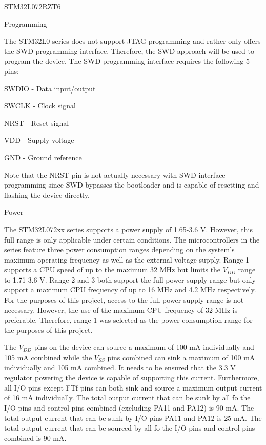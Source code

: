 STM32L072RZT6

Programming

The STM32L0 series does not support JTAG programming and rather only offers the SWD programming interface. Therefore, the SWD approach will be used to program the device. The SWD programming interface requires the following 5 pins:

\begin{compactitem}
	\item SWDIO - Data input/output
	\item SWCLK - Clock signal
	\item NRST - Reset signal
	\item VDD - Supply voltage
	\item GND - Ground reference
\end{compactitem}

Note that the NRST pin is not actually necessary with SWD interface programming since SWD bypasses the bootloader and is capable of resetting and flashing the device directly.

Power

The STM32L072xx series supports a power supply of 1.65-3.6 V. However, this full range is only applicable under certain conditions. The microcontrollers in the series feature three power consumption ranges depending on the system's maximum operating frequency as well as the external voltage supply. Range 1 supports a CPU speed of up to the maximum 32 MHz but limits the $V_{DD}$ range to 1.71-3.6 V. Range 2 and 3 both support the full power supply range but only support a maximum CPU frequency of up to 16 MHz and 4.2 MHz respectively. For the purposes of this project, access to the full power supply range is not necessary. However, the use of the maximum CPU frequency of 32 MHz is preferable. Therefore, range 1 was selected as the power consumption range for the purposes of this project.

The $V_{DD}$ pins on the device can source a maximum of 100 mA individually and 105 mA combined while the $V_{SS}$ pins combined can sink a maximum of 100 mA individually and 105 mA combined. It needs to be ensured that the 3.3 V regulator powering the device is capable of supporting this current. Furthermore, all I/O pins except FTf pins can both sink and source a maximum output current of 16 mA individually. The total output current that can be sunk by all fo the I/O pins and control pins combined (excluding PA11 and PA12) is 90 mA. The total output current that can be sunk by I/O pins PA11 and PA12 is 25 mA. The total output current that can be sourced by all fo the I/O pins and control pins combined is 90 mA.

